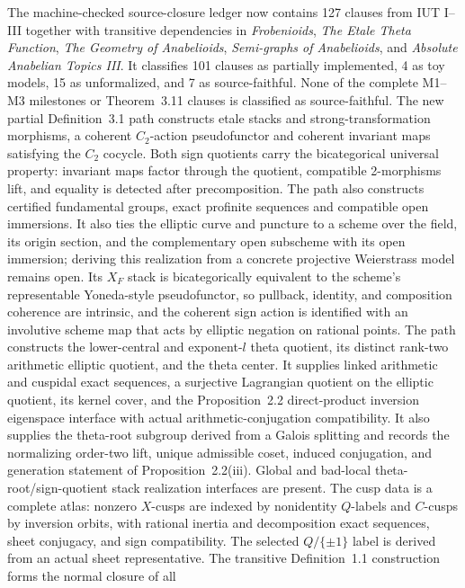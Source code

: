 \documentclass[11pt]{article}
\newcommand{\IUT}{IUT}
\theoremstyle{plain}
\theoremstyle{definition}
\theoremstyle{remark}
\begin{document}
The machine-checked source-closure ledger now contains 127 clauses from
\IUT{} I--III together with transitive dependencies in \emph{Frobenioids},
\emph{The Etale Theta Function}, \emph{The Geometry of Anabelioids},
\emph{Semi-graphs of Anabelioids}, and
\emph{Absolute Anabelian Topics III}.
It classifies 101 clauses as partially implemented, 4 as toy models, 15 as
unformalized, and 7 as source-faithful.  None of the complete M1--M3
milestones or Theorem~3.11 clauses is classified as source-faithful.
The new partial Definition~3.1 path constructs etale stacks and
strong-transformation morphisms, a coherent \(C_2\)-action pseudofunctor and
coherent invariant maps satisfying the \(C_2\) cocycle.  Both sign quotients
carry the bicategorical universal property: invariant maps factor through the
quotient, compatible 2-morphisms lift, and equality is detected after
precomposition.  The path also constructs certified fundamental groups, exact
profinite sequences and compatible open immersions.  It also ties the elliptic curve and
puncture to a scheme over the field, its origin section, and the complementary
open subscheme with its open immersion; deriving this realization from a
concrete projective Weierstrass model remains open.  Its \(X_F\) stack is
bicategorically equivalent to the scheme's representable Yoneda-style
pseudofunctor, so pullback, identity, and composition coherence are intrinsic,
and the coherent
sign action is identified with an involutive scheme map that acts by elliptic
negation on rational points.  The path constructs the
lower-central and exponent-\(l\)
theta quotient, its distinct rank-two arithmetic elliptic quotient, and the
theta center.  It supplies linked arithmetic and cuspidal exact sequences, a
surjective Lagrangian quotient on the elliptic quotient, its kernel cover, and
the Proposition~2.2 direct-product inversion eigenspace interface with actual
arithmetic-conjugation compatibility.  It also supplies the
theta-root subgroup derived from a Galois splitting and records the normalizing
order-two lift, unique admissible coset, induced conjugation, and generation
statement of Proposition~2.2(iii).  Global and bad-local
theta-root/sign-quotient stack realization interfaces are present.  The cusp
data is a complete atlas: nonzero \(X\)-cusps are indexed by nonidentity
\(Q\)-labels and \(C\)-cusps by inversion orbits, with rational inertia and
decomposition exact sequences, sheet conjugacy, and sign compatibility.  The
selected \(Q/\{\pm1\}\) label is derived from an actual sheet representative.
The transitive Definition~1.1 construction forms the normal closure of all
\end{document}
